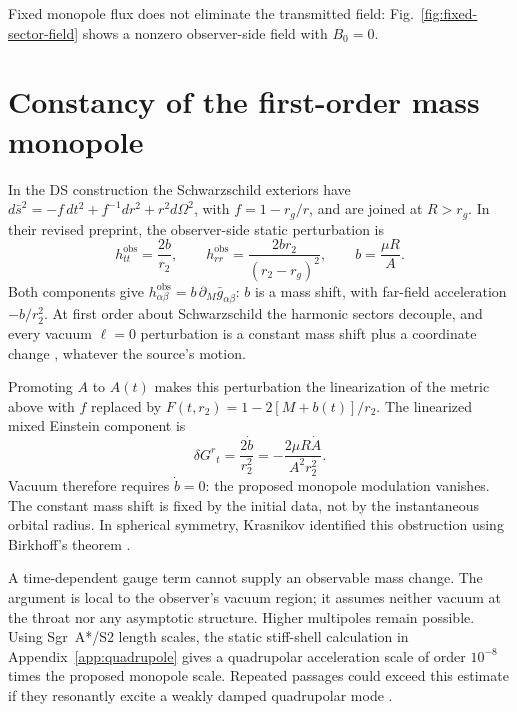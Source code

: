 \documentclass[aps,prd,10pt,onecolumn,nofootinbib,superscriptaddress,floatfix]{revtex4-2}
\begin{document}
Fixed monopole flux does not eliminate the transmitted field:
Fig.~\ref{fig:fixed-sector-field} shows a nonzero observer-side field
with $B_0=0$.

\section{Constancy of the first-order mass monopole}
\label{sec:gravity}

In the DS construction the Schwarzschild exteriors have
$d\bar s^2=-f\,dt^2+f^{-1}dr^2+r^2d\Omega^2$, with
$f=1-r_g/r$, and are joined at $R>r_g$.
In their revised preprint, the observer-side static perturbation is
\cite{DaiStojkovic2019ObservingV3}
\begin{equation}
 h^{\mathrm{obs}}_{tt}=\frac{2b}{r_2},\qquad
 h^{\mathrm{obs}}_{rr}=\frac{2br_2}{(r_2-r_g)^2},\qquad
 b=\frac{\mu R}{A}.
 \label{eq:ds-observer-mode}
\end{equation}
Both components give
$h^{\mathrm{obs}}_{\alpha\beta}=b\,\partial_M\bar g_{\alpha\beta}$:
$b$ is a mass shift, with far-field acceleration $-b/r_2^2$.
At first order about Schwarzschild the harmonic sectors decouple, and every
vacuum $\ell=0$ perturbation is a constant mass shift plus a coordinate
change \cite{MartelPoisson2005SchwarzschildPerturbations}, whatever the
source's motion.

\begin{samepage}
Promoting $A$ to $A(t)$ makes this perturbation the linearization of
the metric above with $f$ replaced by
$F(t,r_2)=1-2[M+b(t)]/r_2$.  The linearized mixed Einstein component is
\begin{equation}
 \delta G^r{}_t=\frac{2\dot b}{r_2^2}
 =-\frac{2\mu R\dot A}{A^2r_2^2}.
 \label{eq:momentum-constraint}
\end{equation}
Vacuum therefore requires $\dot b=0$: the proposed monopole modulation
vanishes.  The constant mass shift is fixed by the initial data, not by
the instantaneous orbital radius.
In spherical symmetry, Krasnikov identified this obstruction using
Birkhoff's theorem \cite{Krasnikov2020CommentObserving}.
\end{samepage}

A time-dependent gauge term cannot supply an observable mass change.
The argument is local to the observer's vacuum region; it assumes
neither vacuum at the throat nor any asymptotic structure.
Higher multipoles remain possible.  Using Sgr~A*/S2 length scales, the
static stiff-shell calculation in Appendix~\ref{app:quadrupole} gives a
quadrupolar acceleration scale of order
$10^{-8}$ times the proposed monopole scale.  Repeated passages could
exceed this estimate if they resonantly excite a weakly damped quadrupolar
mode \cite{CardosoFranzinPani2016Ringdown}.
\end{document}
